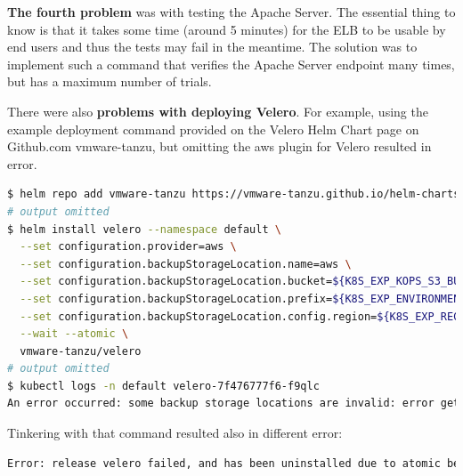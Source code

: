 \textbf{The fourth problem} was with testing the Apache Server. The essential thing to know is that it takes some time (around 5 minutes) for the ELB to be usable by end users and thus the tests may fail in the meantime. The solution was to implement such a command that verifies the Apache Server endpoint many times, but has a maximum number of trials.

There were also \textbf{problems with deploying Velero}. For example, using the example deployment command provided on the Velero Helm Chart page on Github.com vmware-tanzu\cite{velero-helm-chart}, but omitting the aws plugin for Velero resulted in error.

\begin{lstlisting}[basicstyle=\tiny,caption={TODO},captionpos=b,language=Bash,xleftmargin=1cm]
$ helm repo add vmware-tanzu https://vmware-tanzu.github.io/helm-charts
# output omitted
$ helm install velero --namespace default \
  --set configuration.provider=aws \
  --set configuration.backupStorageLocation.name=aws \
  --set configuration.backupStorageLocation.bucket=${K8S_EXP_KOPS_S3_BUCKET} \
  --set configuration.backupStorageLocation.prefix=${K8S_EXP_ENVIRONMENT} \
  --set configuration.backupStorageLocation.config.region=${K8S_EXP_REGION} \
  --wait --atomic \
  vmware-tanzu/velero
# output omitted
$ kubectl logs -n default velero-7f476777f6-f9qlc
An error occurred: some backup storage locations are invalid: error getting backup store for location "aws": unable to locate ObjectStore plugin named velero.io/aws
\end{lstlisting}

Tinkering with that command resulted also in different error:
\begin{lstlisting}[basicstyle=\tiny,caption={TODO},captionpos=b,language=Bash,xleftmargin=1cm]
Error: release velero failed, and has been uninstalled due to atomic being set: timed out waiting for the condition
\end{lstlisting}


